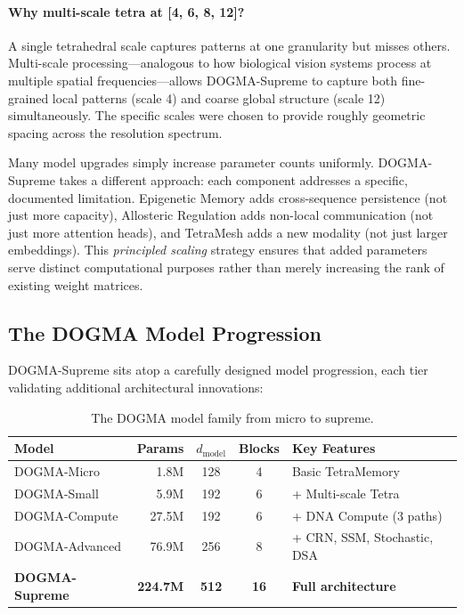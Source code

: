 \paragraph{Why multi-scale tetra at [4, 6, 8, 12]?} A single tetrahedral scale captures patterns at one granularity but misses others. Multi-scale processing---analogous to how biological vision systems process at multiple spatial frequencies---allows DOGMA-Supreme to capture both fine-grained local patterns (scale 4) and coarse global structure (scale 12) simultaneously. The specific scales were chosen to provide roughly geometric spacing across the resolution spectrum.

\begin{keyinsight}
Many model upgrades simply increase parameter counts uniformly. DOGMA-Supreme takes a different approach: each component addresses a specific, documented limitation. Epigenetic Memory adds cross-sequence persistence (not just more capacity), Allosteric Regulation adds non-local communication (not just more attention heads), and TetraMesh adds a new modality (not just larger embeddings). This \emph{principled scaling} strategy ensures that added parameters serve distinct computational purposes rather than merely increasing the rank of existing weight matrices.
\end{keyinsight}

\subsection{The DOGMA Model Progression}

DOGMA-Supreme sits atop a carefully designed model progression, each tier validating additional architectural innovations:

\begin{table}[H]
\centering
\caption{The DOGMA model family from micro to supreme.}
\label{tab:dogma-tiers}
\begin{tabularx}{\textwidth}{L{3.2cm} r c c Y}
\toprule
\textbf{Model} & \textbf{Params} & \textbf{$d_{\text{model}}$} & \textbf{Blocks} & \textbf{Key Features} \\
\midrule
DOGMA-Micro   & 1.8M  & 128 & 4  & Basic TetraMemory \\
DOGMA-Small   & 5.9M  & 192 & 6  & + Multi-scale Tetra \\
DOGMA-Compute & 27.5M & 192 & 6  & + DNA Compute (3 paths) \\
DOGMA-Advanced & 76.9M & 256 & 8  & + CRN, SSM, Stochastic, DSA \\
\textbf{DOGMA-Supreme} & \textbf{224.7M} & \textbf{512} & \textbf{16} & \textbf{Full architecture} \\
\bottomrule
\end{tabularx}
\end{table}

